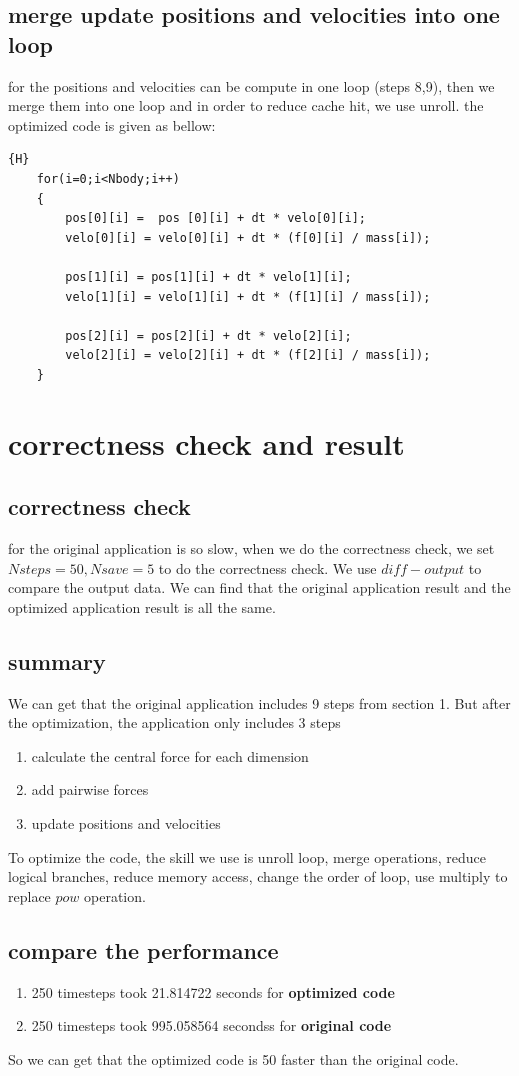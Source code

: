 \documentclass{article}
\begin{document}
\subsection{merge update positions and velocities into one loop}
for the positions and velocities can be compute in one loop (steps 8,9), then we merge them into one loop and in order to reduce cache hit, we use unroll. the optimized code is given as bellow:
\begin{lstlisting}[caption={merge steps 8,9 into one step}]{H}
	for(i=0;i<Nbody;i++)
	{
		pos[0][i] =  pos [0][i] + dt * velo[0][i];
		velo[0][i] = velo[0][i] + dt * (f[0][i] / mass[i]);
		
		pos[1][i] = pos[1][i] + dt * velo[1][i];
		velo[1][i] = velo[1][i] + dt * (f[1][i] / mass[i]);
		
		pos[2][i] = pos[2][i] + dt * velo[2][i];
		velo[2][i] = velo[2][i] + dt * (f[2][i] / mass[i]);
	}
\end{lstlisting}
\section{correctness check and result}
\subsection{correctness check}
for the original application is so slow, when we do the correctness check, we set $Nsteps =50,Nsave=5$ to do the correctness check. We use $diff-output$ to compare the output data. We can find that the original application result and the optimized application result is all the same.
\subsection{summary}
We can get that the original application includes 9 steps from section 1. But after the optimization, the application only includes 3 steps
\begin{enumerate}
	\item calculate the central force for each dimension
	\item add pairwise forces
	\item update positions and velocities
\end{enumerate}
To optimize the code, the skill we use is unroll loop, merge operations, reduce logical branches, reduce memory access, change the order of loop, use multiply to replace $pow$ operation.
\subsection{compare the performance}
\begin{enumerate}
\item 250 timesteps took 21.814722 seconds for \textbf{optimized code}
\item 250 timesteps took 995.058564 secondss for \textbf{original code}

\end{enumerate}
So we can get that the optimized code is 50 faster than the original code.
\end{document}
